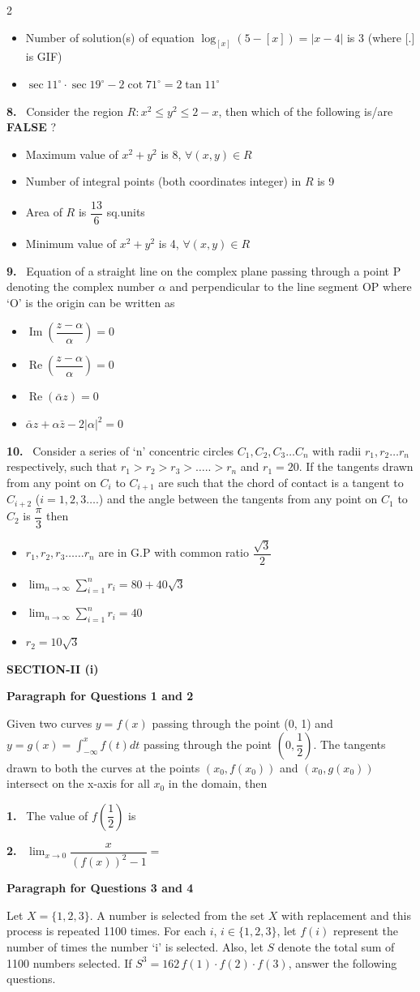 \documentclass[10pt]{extarticle}
\newcommand{\sect}[1]{\par\smallskip\noindent\textbf{#1}\par}
\newcommand{\qn}[1]{\par\smallskip\noindent\textbf{#1.}~}
\newcommand{\paraq}[2]{\par\smallskip\noindent\textbf{Paragraph for Questions #1 and #2}\par}
\newenvironment{qoptions}{\begin{itemize}[leftmargin=1.8em,itemsep=1pt,topsep=2pt,label={}]}{\end{itemize}}
\newcommand{\opt}[2]{\item[(#1)] #2}
\begin{document}
\begin{multicols}{2}
\begin{qoptions}
\opt{C}{Number of solution(s) of equation $\log_{[x]}(5-[x])=|x-4|$ is 3 (where [.] is GIF)}
\opt{D}{$\sec11^\circ\cdot\sec19^\circ-2\cot71^\circ=2\tan11^\circ$}
\end{qoptions}
\qn{8} Consider the region $R:x^2\leq y^2\leq2-x$, then which of the following is/are \textbf{FALSE} ?
\begin{qoptions}
\opt{A}{Maximum value of $x^2+y^2$ is 8, $\forall(x,y)\in R$}
\opt{B}{Number of integral points (both coordinates integer) in $R$ is 9}
\opt{C}{Area of $R$ is $\dfrac{13}{6}$ sq.units}
\opt{D}{Minimum value of $x^2+y^2$ is 4, $\forall(x,y)\in R$}
\end{qoptions}
\qn{9} Equation of a straight line on the complex plane passing through a point P denoting the complex number $\alpha$ and perpendicular to the line segment OP where `O' is the origin can be written as
\begin{qoptions}
\opt{A}{$\operatorname{Im}\left(\dfrac{z-\alpha}{\alpha}\right)=0$}
\opt{B}{$\operatorname{Re}\left(\dfrac{z-\alpha}{\alpha}\right)=0$}
\opt{C}{$\operatorname{Re}(\bar\alpha z)=0$}
\opt{D}{$\bar\alpha z+\alpha\bar z-2|\alpha|^2=0$}
\end{qoptions}
\qn{10} Consider a series of `n' concentric circles $C_1,C_2,C_3\ldots C_n$ with radii $r_1,r_2\ldots r_n$ respectively, such that $r_1>r_2>r_3>\ldots..>r_n$ and $r_1=20$. If the tangents drawn from any point on $C_i$ to $C_{i+1}$ are such that the chord of contact is a tangent to $C_{i+2}$ ($i=1,2,3\ldots.$) and the angle between the tangents from any point on $C_1$ to $C_2$ is $\dfrac\pi3$ then
\begin{qoptions}
\opt{A}{$r_1,r_2,r_3\ldots\ldots r_n$ are in G.P with common ratio $\dfrac{\sqrt3}{2}$}
\opt{B}{$\displaystyle\lim_{n\to\infty}\sum_{i=1}^nr_i=80+40\sqrt3$}
\opt{C}{$\displaystyle\lim_{n\to\infty}\sum_{i=1}^nr_i=40$}
\opt{D}{$r_2=10\sqrt3$}
\end{qoptions}
\sect{SECTION-II (i)}
\paraq{1}{2}Given two curves $y=f(x)$ passing through the point (0, 1) and $y=g(x)=\displaystyle\int_{-\infty}^xf(t)dt$ passing through the point $\left(0,\dfrac12\right)$. The tangents drawn to both the curves at the points $(x_0,f(x_0))$ and $(x_0,g(x_0))$ intersect on the x-axis for all $x_0$ in the domain, then\par
\qn{1} The value of $f\left(\dfrac12\right)$ is
\qn{2} $\displaystyle\lim_{x\to0}\dfrac{x}{(f(x))^2-1}=$
\paraq{3}{4}Let $X=\{1,2,3\}$. A number is selected from the set $X$ with replacement and this process is repeated 1100 times. For each $i$, $i\in\{1,2,3\}$, let $f(i)$ represent the number of times the number `i' is selected. Also, let $S$ denote the total sum of 1100 numbers selected. If $S^3=162\,f(1)\cdot f(2)\cdot f(3)$, answer the following questions.\par

\end{multicols}
\end{document}
